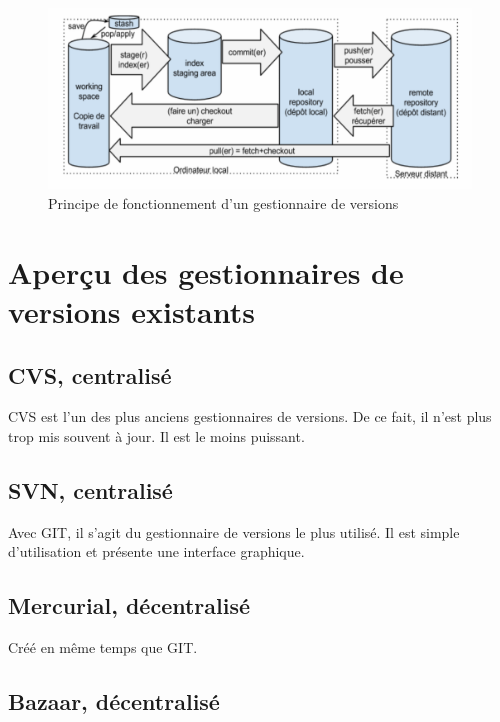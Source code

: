\begin{figure}[!h]
\centering
\includegraphics[scale=0.6]{images/technique_git.png}
\caption{Principe de fonctionnement d'un gestionnaire de versions}
\label{fonction}
\end{figure}

\section{Aperçu des gestionnaires de versions existants}


\subsection{CVS, centralisé}

CVS est l'un des plus anciens gestionnaires de versions. De ce fait, il n'est plus trop mis souvent à jour. Il est le moins puissant. 

\subsection{SVN, centralisé}

Avec GIT, il s'agit du gestionnaire de versions le plus utilisé. Il est simple d'utilisation et présente une interface graphique. 

\subsection{Mercurial, décentralisé}

Créé en même temps que GIT. 

\subsection{Bazaar, décentralisé}

